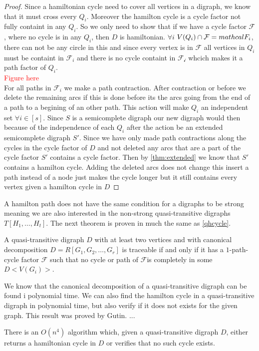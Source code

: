 \begin{proof}
    Since a hamiltonian cycle need to cover all vertices in a digraph, we know that it must cross every $Q_i$. 
    Moreover the hamilton cycle is a cycle factor not fully containt in any $Q_i$. So we only need to show that if we have a cycle factor $\mathcal{F}$, where no cycle is in any $Q_i$, then $D$ is hamiltonian. $\forall i$ $V(Q_i)\cap \mathcal{F}=\\mathcal{F}_i$, there can not be any circle in this and since every vertex is in $\mathcal{F}$ all vertices in $Q_i$ must be containt in $\mathcal{F}_i$ and there is no cycle containt in $\mathcal{F_i}$ whcich makes it a path factor of $Q_i$.\\
    \textcolor{red}{Figure here}\\
    For all paths in $\mathcal{F}_i$ we make a path contraction. 
    After contraction or before we delete the remaining arcs if this is done before its the arcs going from the end of a path to a begining of an other path. This action will make $Q_i$ an independent set $\forall i\in [s]$. Since $S$ is a semicomplete digraph our new digraph would then because of the independence of each $Q_i$ after the action be an extended semicomplete digraph $S'$. 
    Since we have only made path contractions along the cycles in the cycle factor of $D$ and not deleted any arcs that are a part of the cycle factor $S'$ contains a cycle factor. 
    Then by \autoref{thm:extended} we know that $S'$ contains a hamilton cycle. Adding the deleted arcs does not change this insert a path instead of a node just makes the cycle longer but it still contains every vertex given a hamilton cycle in $D$
\end{proof}

A hamilton path does not have the same condition for a digraphs to be strong meaning we are also interested in the non-strong quasi-transitive digraphs $T[H_1,\dots ,H_t]$. 
The next theorem is proven in much the same as \autoref{qhcycle}. 
\begin{thm}
    A quasi-transitive digraph $D$ with at least two vertices and with canonical decomposition $D=R[G_1,G_2,\dots , G_r]$ is traceable if and only if it has a $1$-path-cycle factor $\mathcal{F}$ such that no cycle or path of $\mathcal{F}$is completely in some $D<V(G_i)>$.
\end{thm}

We know that the canonical decomposition of a quasi-transitive digraph can be found i polynomial time. 
We can also find the hamilton cycle in a quasi-transitive digraph in polynomial time, but also verify if it does not exists for the given graph. This result was proved by Gutin. ... 

\begin{thm}
    There is an $O(n^4)$ algorithm which, given a quasi-transitive digraph $D$, either returns a hamiltonian cycle in $D$ or verifies that no such cycle exists.
\end{thm}




